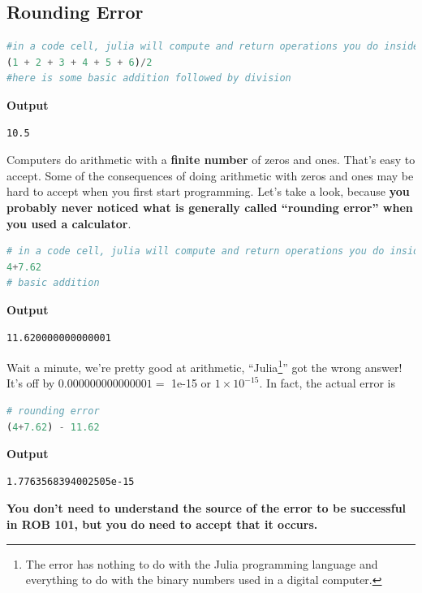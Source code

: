 \setlength{\fboxrule}{3pt}%
	\centerline{ %
}

\subsection{Rounding Error}

\begin{lstlisting}[language=Julia,style=mystyle]
#in a code cell, julia will compute and return operations you do inside it
(1 + 2 + 3 + 4 + 5 + 6)/2
#here is some basic addition followed by division
\end{lstlisting}
\textbf{Output} 
\begin{verbatim}
10.5
\end{verbatim}

Computers do arithmetic with a \textbf{finite number} of zeros and ones.  That's easy to accept. Some of the consequences of doing arithmetic with zeros and ones may be hard to accept when you first start programming. Let's take a look, because \textbf{you probably never noticed what is generally called ``rounding error'' when you used a calculator}. 

\begin{lstlisting}[language=Julia,style=mystyle]
# in a code cell, julia will compute and return operations you do inside it
4+7.62
# basic addition
\end{lstlisting}
\textbf{Output} 
\begin{verbatim}
11.620000000000001
\end{verbatim}
Wait a minute, we're pretty good at arithmetic, ``Julia\footnote{The error has nothing to do with the Julia programming language and everything to do with the binary numbers used in a digital computer.}'' got the wrong answer! It's off by $0.000000000000001 =$ 1e-15 or $1 \times 10^{-15}$. In fact, the actual error is 
\begin{lstlisting}[language=Julia,style=mystyle]
# rounding error
(4+7.62) - 11.62
\end{lstlisting}
\textbf{Output} 
\begin{verbatim}
1.7763568394002505e-15
\end{verbatim}
\textbf{You don't need to understand the source of the error to be successful in ROB 101, but you do need to accept that it occurs.} \\

